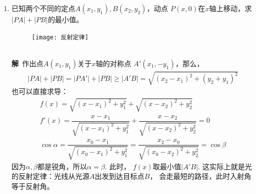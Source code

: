 \begin{enumerate}[label={【\textbf{例\thechapter.\arabic*}】},
 leftmargin=\inteval{\myenumleftmargin}pt,
 itemsep=\inteval{\myenumitempsep}pt,
 itemindent=\inteval{\myenumitemindent}pt]
\item 已知两个不同的定点$ A(x_1,y_1),B(x_2,y_2) $，动点
$P(x,0)$在$x$轴上移动，求$ |PA|+|PB| $的最小值。
\begin{figure}[h]
    \centering
    \texttt{[image: 反射定律]}
\end{figure}  \\
\textbf{解}\ 作出点$ A(x_1,y_1) $关于$ x $轴的对称点
$ A'(x_1,-y_1) $，那么，
\begin{align*}
    |PA|+|PB|=|PA'|+|PB|\geq |A'B|=\sqrt{(x_2-x_1)^2+(y_2+y_1)^2}
\end{align*}
也可以直接求导：
\begin{gather*}
    f(x)=\sqrt{(x-x_1)^2+y_1^2}+\sqrt{(x-x_2)^2+y_2^2} \\
    f'(x)=\dfrac{x-x_1}{\sqrt{(x-x_1)^2+y_1^2}}+
    \dfrac{x-x_2}{\sqrt{(x-x_2)^2+y_2^2}}=0  \\
    \cos \alpha=\dfrac{x_0-x_1}{\sqrt{(x_0-x_1)^2+y_1^2}}=
    \dfrac{x_2-x_0}{\sqrt{(x_0-x_2)^2+y_2^2}} =\cos \beta
\end{gather*}
因为$ \alpha,\beta $都是锐角，所以$ \alpha=\beta $. 此时，
$ f(x) $取最小值$ |A'B| $.
这实际上就是光的反射定律：光线从光源$ A $出发到达目标点$ B $，
会走最短的路径，此时入射角等于反射角。


\end{enumerate}
